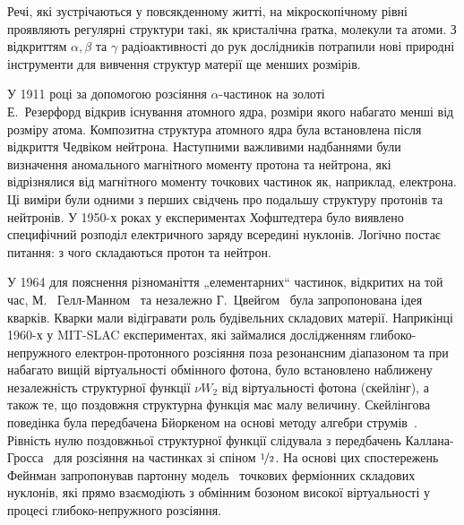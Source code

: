 Речі, які зустрічаються у повсякденному житті, на мікроскопічному рівні проявляють регулярні структури такі, як кристалічна ґратка, молекули та атоми. З відкриттям $\alpha,\beta$ та $\gamma$ радіоактивності до рук дослідників потрапили нові природні інструменти для вивчення структур матерії ще менших розмірів.

У 1911 році за допомогою розсіяння $\alpha$-частинок на золоті\\Е.~Резерфорд відкрив існування атомного ядра, розміри якого набагато менші від розміру атома. Композитна структура атомного ядра була встановлена після відкриття Чедвіком нейтрона. Наступними важливими надбаннями були визначення аномального магнітного моменту протона та нейтрона, які відрізнялися від магнітного моменту точкових частинок як, наприклад, електрона. Ці виміри були одними з перших свідчень про подальшу структуру протонів та нейтронів. У 1950-х роках у експериментах Хофштедтера було виявлено специфічний розподіл електричного заряду всередині нуклонів. Логічно постає питання: з чого складаються протон та нейтрон.

У 1964 для пояснення різноманіття „елементарних“ частинок, відкритих на той час, М.~ Гелл-Манном~\cite{GellMann:1964nj} та незалежно Г.~Цвейгом~\cite{Zweig:1964jf} була запропонована ідея кварків. Кварки мали відігравати роль будівельних складових матерії. Наприкінці 1960-х у MIT-SLAC експериментах, які займалися дослідженням глибоко-непружного електрон-протонного розсіяння поза резонансним діапазоном та при набагато вищій віртуальності обмінного фотона, було встановлено наближену незалежність структурної функції $\nu W_2$ від віртуальності фотона (скейлінг), а також те, що поздовжня структурна функція має малу величину. Скейлінгова поведінка була передбачена Бйоркеном на основі методу алгебри струмів~\cite{Bjorken:1968dy}. Рівність нулю поздовжньої структурної функції слідувала з передбачень Каллана-Гросса~\cite{Callan:1969uq} для розсіяння на частинках зі спіном $\nicefrac{1}{2}$. На основі цих спостережень Фейнман запропонував партонну модель~\cite{Feynman:1969ej} точкових ферміонних складових нуклонів, які прямо взаємодіють з обмінним бозоном високої віртуальності у процесі глибоко-непружного розсіяння.

